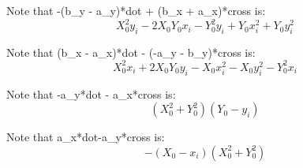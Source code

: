 \documentclass[8pt]{article}
\begin{document}
Note that -(b\_y - a\_y)*dot + (b\_x + a\_x)*cross is:
\begin{equation}X_{0}^{2} y_{i} - 2 X_{0} Y_{0} x_{i} - Y_{0}^{2} y_{i} + Y_{0} x_{i}^{2} + Y_{0} y_{i}^{2}\end{equation}

Note that (b\_x - a\_x)*dot - (-a\_y - b\_y)*cross is:
\begin{equation}X_{0}^{2} x_{i} + 2 X_{0} Y_{0} y_{i} - X_{0} x_{i}^{2} - X_{0} y_{i}^{2} - Y_{0}^{2} x_{i}\end{equation}

Note that -a\_y*dot - a\_x*cross is:
\begin{equation}\left(X_{0}^{2} + Y_{0}^{2}\right) \left(Y_{0} - y_{i}\right)\end{equation}

Note that a\_x*dot-a\_y*cross is:
\begin{equation}- \left(X_{0} - x_{i}\right) \left(X_{0}^{2} + Y_{0}^{2}\right)\end{equation}
\end{document}
